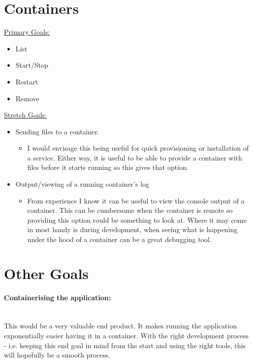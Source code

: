 \documentclass{article}
\begin{document}
\newpage

\section{Containers}

\underline {Primary Goals:}
\begin{itemize}
	\item List
	\item Start/Stop
	\item Restart
	\item Remove
\end{itemize}
\underline {Stretch Goals:}
\begin{itemize}
	\item Sending files to a container.
	\begin{itemize}
		\item I would envisage this being useful for quick provisioning or installation of a service. Either way, it is useful to be able to provide a container with files before it starts running so this gives that option.
	\end{itemize}
	\item Output/viewing of a running container's log
	\begin{itemize}
		\item From experience I know it can be useful to view the console output of a container. This can be cumbersome when the container is remote so providing this option could be something to look at. Where it may come in most handy is during development, when seeing what is happening under the hood of a container can be a great debugging tool.
	\end{itemize}
\end{itemize}

\newpage
\section{Other Goals}

\paragraph{Containerising the application:}\mbox{}\\
This would be a very valuable end product. It makes running the application exponentially easier having it in a container. With the right development process - i.e. keeping this end goal in mind from the start and using the right tools, this will hopefully be a smooth process.
\end{document}
